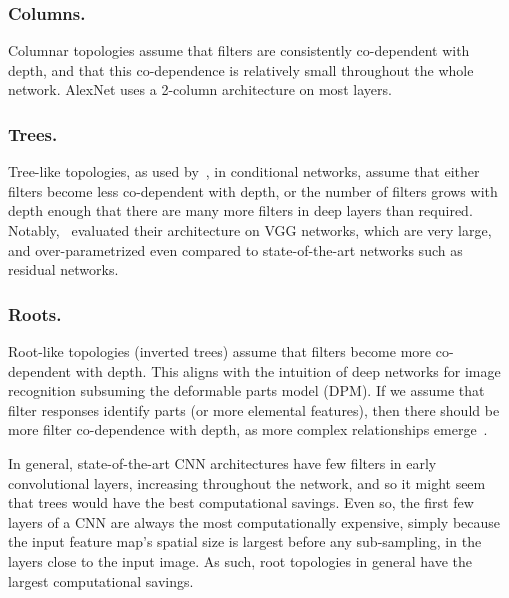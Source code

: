\documentclass[thesis]{subfiles}
\begin{document}
	\subsubsection{Columns.} Columnar topologies assume that filters are consistently co-dependent with depth, and that this co-dependence is relatively small throughout the whole network. AlexNet uses a 2-column architecture on most layers.
	
	\subsubsection{Trees.} Tree-like topologies, as used by~\citet{Ioannou2015lowrank},  in conditional networks, assume that either filters become less co-dependent with depth, or the number of filters grows with depth enough that there are many more filters in deep layers than required. Notably,~\citet{Ioannou2015lowrank} evaluated their architecture on VGG networks, which are very large, and over-parametrized even compared to state-of-the-art networks such as residual networks.
	
	\subsubsection{Roots.} Root-like topologies (\ie inverted trees) assume that filters become more co-dependent with depth.  This aligns with the intuition of deep networks for image recognition subsuming the deformable parts model (DPM). If we assume that filter responses identify parts (or more elemental features), then there should be more filter co-dependence with depth, as more complex relationships emerge~\cite{girshick2015deformable}.
	
	In general, state-of-the-art CNN architectures have few filters in early convolutional layers, increasing throughout the network, and so it might seem that trees would have the best computational savings. Even so, the first few layers of a CNN are always the most computationally expensive, simply because the input feature map's spatial size is largest before any sub-sampling, in the layers close to the input image. As such, root topologies in general have the largest computational savings.
	
	
\end{document}
